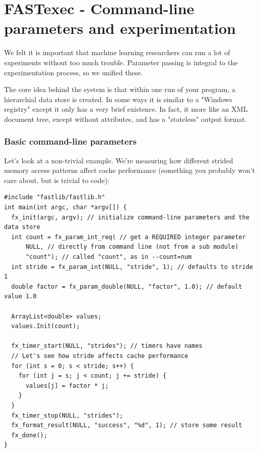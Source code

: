 \documentclass[letter]{report}
\begin{document}
\section{FASTexec - Command-line parameters and experimentation}

We felt it is important that machine learning researchers can run a lot of experiments without too much trouble. Parameter passing is integral to the experimentation process, so we unified these.

The core idea behind the system is that within one run of your program, a hierarchial data store is created. In some ways it is similar to a "Windows registry" except it only has a very brief existence. In fact, it more like an XML document tree, except without attributes, and has a "stateless" output format.

\subsubsection{Basic command-line parameters}

Let's look at a non-trivial example. We're measuring how different strided memory access patterns affect cache performance (something you probably won't care about, but is trivial to code):
\begin{verbatim}
#include "fastlib/fastlib.h"
int main(int argc, char *argv[]) {
  fx_init(argc, argv); // initialize command-line parameters and the data store
  int count = fx_param_int_req( // get a REQUIRED integer parameter
      NULL, // directly from command line (not from a sub module)
      "count"); // called "count", as in --count=num
  int stride = fx_param_int(NULL, "stride", 1); // defaults to stride 1
  double factor = fx_param_double(NULL, "factor", 1.0); // default value 1.0
  
  ArrayList<double> values;
  values.Init(count);

  fx_timer_start(NULL, "strides"); // timers have names
  // Let's see how stride affects cache performance
  for (int s = 0; s < stride; s++) {
    for (int j = s; j < count; j += stride) {
      values[j] = factor * j;
    }
  }
  fx_timer_stop(NULL, "strides");
  fx_format_result(NULL, "success", "%d", 1); // store some result
  fx_done();
}
\end{verbatim}
\end{document}

